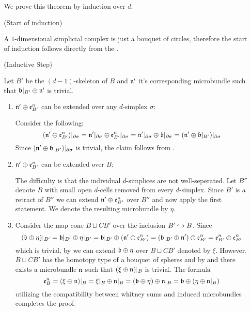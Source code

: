 \begin{myproof}
    We prove this theorem by induction over $d$.

    (Start of induction)

    A $1$-dimensional simplicial complex is just a bouquet of circles, therefore
    the start of induction follows directly from the .   

    (Inductive Step)

    Let $B'$ be the $(d - 1)$-skeleton of $B$ and $\mathfrak{n}'$ it's corresponding microbundle
    such that $\mathfrak{b}\vert_{B'} \oplus \mathfrak{n}'$ is trivial.

    \begin{enumerate}
        \item $\mathfrak{n}' \oplus \mathfrak{e}^n_{B'}$ can be extended over any $d$-simplex $\sigma$:

        Consider the following:
        \[
            (\mathfrak{n}' \oplus \mathfrak{e}^n_{B'})\vert_{\partial\sigma}
            = \mathfrak{n}'\vert_{\partial\sigma} \oplus \mathfrak{e}^n_{B'}\vert_{\partial\sigma}
            = \mathfrak{n}'\vert_{\partial\sigma} \oplus \mathfrak{b}\vert_{\partial\sigma}
            = (\mathfrak{n}' \oplus \mathfrak{b}\vert_{B'})\vert_{\partial\sigma}
        \]
        Since $(\mathfrak{n}' \oplus \mathfrak{b}\vert_{B'})\vert_{\partial\sigma}$ is trivial, the claim follows from .

        \item $\mathfrak{n}' \oplus \mathfrak{e}^n_{B'}$ can be extended over $B$:

        The difficulty is that the individual $d$-simplices are not well-seperated.
        Let $B''$ denote $B$ with small open $d$-cells removed from every $d$-simplex.
        Since $B'$ is a retract of $B''$ we can extend $\mathfrak{n}' \oplus \mathfrak{e}^n_{B'}$ over $B''$ and now apply the first statement.
        We denote the resulting microbundle by $\eta$.

        \item
        Consider the map-cone $B \sqcup CB'$ over the inclusion $B' \hookrightarrow{} B$.
        Since
        \[
            (\mathfrak{b} \oplus \eta)\vert_{B'}
            = \mathfrak{b}\vert_{B'} \oplus \eta\vert_{B'}
            = \mathfrak{b}\vert_{B'} \oplus (\mathfrak{n}' \oplus \mathfrak{e}^n_{B'})
            = (\mathfrak{b}\vert_{B'} \oplus \mathfrak{n}') \oplus \mathfrak{e}^n_{B'}
            = \mathfrak{e}^n_{B'} \oplus \mathfrak{e}^n_{B'}
        \]
        which is trivial, by  we can extend $\mathfrak{b} \oplus \eta$ over $B \sqcup CB'$ denoted by $\xi$.
        However, $B \sqcup CB'$ has the homotopy type of a bouquet of spheres and by  and  there exists a microbundle $\mathfrak{n}$ such that $(\xi \oplus \mathfrak{n})\vert_{B}$ is trivial.
        The formula
        \[
            \mathfrak{e}^n_{B}
            = (\xi \oplus \mathfrak{n})\vert_{B}
            = \xi\vert_{B} \oplus \mathfrak{n}\vert_{B}
            = (\mathfrak{b} \oplus \eta) \oplus \mathfrak{n}\vert_{B}
            = \mathfrak{b} \oplus (\eta \oplus \mathfrak{n}\vert_{B})
        \]
        utilizing the compatibility between whitney sums and induced microbundles completes the proof.
    \end{enumerate}
\end{myproof}